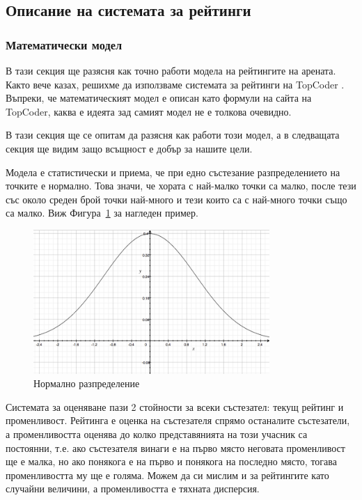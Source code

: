\documentclass[a4paper,12pt]{article}
\begin{document}
  \subsection{Описание на системата за рейтинги}
  
  
  \subsubsection{Математически модел}
  В тази секция ще разясня как точно работи модела на рейтингите на арената. Както вече казах, решихме да използваме системата за рейтинги на TopCoder \cite{topcoder_ratings}. Въпреки, че математическият модел е описан като формули на сайта на TopCoder, каква е идеята зад самият модел не е толкова очевидно.

  В тази секция ще се опитам да разясня как работи този модел, а в следващата секция ще видим защо всъщност е добър за нашите цели.
  
  Модела е статистически и приема, че при едно състезание разпределението на точките е нормално. Това значи, че хората с най-малко точки са малко, после тези със около среден брой точки най-много и тези които са с най-много точки също са малко. Виж Фигура~\ref{normal_distribution} за нагледен пример.
  
  \begin{figure}
    \begin{center}
      \includegraphics[width=0.8\textwidth]{images/normal_distribution.png}
    \end{center}
    \caption{Нормално разпределение}
    \label{normal_distribution}
  \end{figure}
  
  Системата за оценяване пази 2 стойности за всеки състезател: текущ рейтинг и променливост. Рейтинга е оценка на състезателя спрямо останалите състезатели, а променливостта оценява до колко представянията на този учасник са постоянни, т.е. ако състезателя винаги е на първо място неговата променливост ще е малка, но ако понякога е на първо и понякога на последно място, тогава променливостта му ще е голяма. Можем да си мислим и за рейтингите като случайни величини, а променливостта е тяхната дисперсия. 
  
\end{document}

